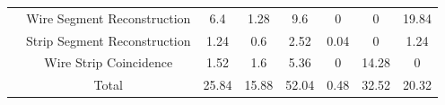 \begin{table}[]
{\begin{tabular}{|c|c|c|c|c|c|c|c|}
                                                                                & Wire Segment Reconstruction  & 6.4                                                       & 1.28                                                      & 9.6                                                      & 0                                                                 & 0                                                      & 19.84                                                  \\ \cline{2-8} 
                                                                                & Strip Segment Reconstruction & 1.24                                                      & 0.6                                                       & 2.52                                                     & 0.04                                                              & 0                                                      & 1.24                                                   \\ \cline{2-8} 
                                                                                & Wire Strip Coincidence       & 1.52                                                      & 1.6                                                       & 5.36                                                     & 0                                                                 & 14.28                                                  & 0                                                      \\ \cline{2-8} 
                                                                                & Total                        & 25.84                                                     & 15.88                                                     & 52.04                                                    & 0.48                                                              & 32.52                                                  & 20.32                                                  \\ \hline
    \end{tabular}
    }
\end{table}

